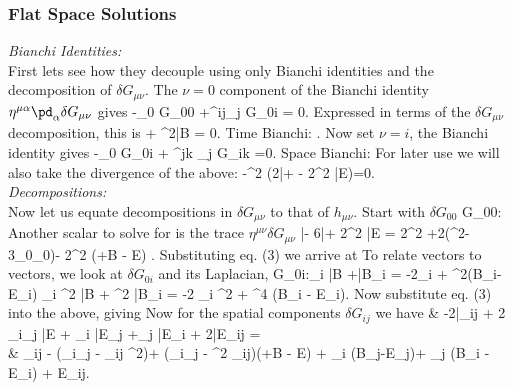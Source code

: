 \documentclass[10pt,letterpaper]{article}
\begin{document}
\subsubsection{Flat Space Solutions}
\textit{Bianchi Identities:}
\\
First lets see how they decouple using only Bianchi identities and the decomposition of $\delta G_{\mu\nu}$. The $\nu = 0$ component of the Bianchi identity $\eta^{\mu\alpha}\pd_\alpha \delta G_{\mu\nu}$ gives
\be
	-\pd_0 \delta G_{00} +\delta^{ij}\del_j \delta G_{0i} = 0.
\ee
Expressed in terms of the $\delta G_{\mu\nu}$ decomposition, this is
\dot{\bar\phi} + \del^2\bar B = 0.
\ee
Time Bianchi:
\be
	.
\ee
Now set $\nu = i$, the Bianchi identity gives
\be
	-\pd_0 \delta G_{0i} + \delta^{jk} \del_j \delta G_{ik} =0.
\ee
Space Bianchi:
\be
\ee
For later use we will also take the divergence of the above:
\be
	-\del^2 (2\bar\psi + - 2\del^2 \bar E)=0.
\ee
\\ 
\textit{Decompositions:}\\
Now let us equate decompositions in $\delta G_{\mu\nu}$ to that of $h_{\mu\nu}$. Start with $\delta G_{00}$
\be
	\delta G_{00}:\quad \boxed{\bar \phi = \del^2 \psi} \quad{}\quad {}
\ee
Another scalar to solve for is the trace $\eta^{\mu\nu} \delta G_{\mu\nu}$
\bar\phi - 6\bar \psi + 2\del^2 \bar E = 2\del^2 \psi +2(\del^2-3\pd_0\pd_0)\psi - 2\del^2 (\phi +\dot B - \ddot E) .
\ee
Substituting eq. (3) we arrive at
\be
\ee
To relate vectors to vectors, we look at $\delta G_{0i}$ and its Laplacian,
\be
	\delta G_{0i}:\quad \del_i \bar B +\bar B_i = -2\del_i \dot \psi +  \del^2(B_i-\dot E_i)
\ee
\be
	\del_i \del^2 \bar B + \del^2 \bar B_i = -2 \del_i \del^2 \dot \psi +  \del^4 (B_i - \dot E_i).
\ee
Now substitute eq. (3)  into the above, giving
\be
\ee
Now for the spatial components $\delta G_{ij}$ we have
\ba
	& -2\bar \psi \delta_{ij} + 2 \del_i\del_j \bar E + \del_i \bar E_j +\del_j \bar E_i + 2\bar E_{ij} =\\
	& \ddot \psi \delta_{ij} - (\del_i\del_j - \delta_{ij} \del^2)\psi + (\del_i\del_j - \del^2 \delta_{ij})(\phi+\dot B - \ddot E) +  \del_i (\dot B_j-\ddot E_j)+ \del_j (\dot B_i - \ddot E_i) + \Box E_{ij}.
\end{document}
